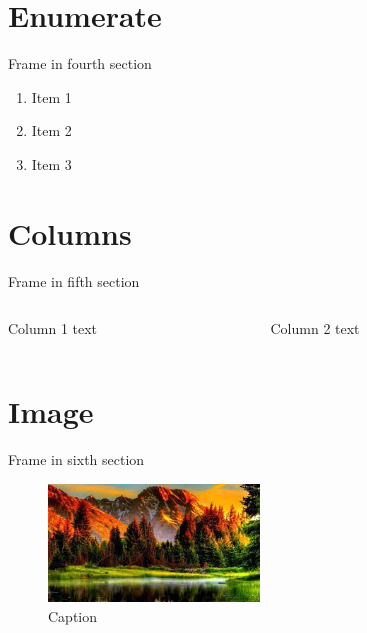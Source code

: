 \documentclass[xetex,aspectratio=169]{beamer}
\begin{document}
    \section{Enumerate}
    \begin{frame}{Frame in fourth section}
        \begin{enumerate}
            \item Item 1
            \item Item 2
            \item Item 3
        \end{enumerate}
    \end{frame}

    \section{Columns}
    \begin{frame}{Frame in fifth section}
        \begin{columns}
            \begin{column}{0.5\textwidth}
               Column 1 text
            \end{column}
            \begin{column}{0.5\textwidth}
                Column 2 text
            \end{column}
        \end{columns}    
    \end{frame}

    \section{Image}
    \begin{frame}{Frame in sixth section}
        \begin{figure}
            \centering
            \includegraphics[width=0.5\textwidth, keepaspectratio]{example_images/nature1.jpg}
            \caption{Caption}
            \label{fig:enter-label}
        \end{figure}
    \end{frame}
\end{document}
